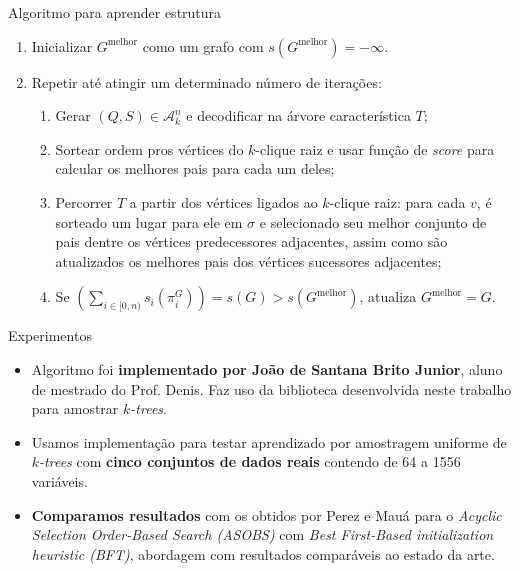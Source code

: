 \documentclass{beamer}
\begin{document}
\begin{frame}
\begin{columns}[t]
\begin{column}{0.5\textwidth}
\begin{block}{Algoritmo para aprender estrutura}
    \begin{enumerate}
      \item Inicializar $G^{\text{melhor}}$ como um grafo com $s(G^{\text{melhor}}) = -\infty$.
      \item Repetir até atingir um determinado número de iterações:
        \begin{enumerate}
          \item Gerar $(Q, S) \in \mathcal{A}^n_k$ e decodificar na árvore característica $T$;
          \item Sortear ordem pros vértices do $k$-clique raiz e usar função de \emph{score} para calcular os melhores pais para cada um deles;
          \item Percorrer $T$ a partir dos vértices ligados ao $k$-clique raiz: para cada $v$, é sorteado um lugar para ele em $\sigma$ e selecionado seu melhor conjunto de pais dentre os vértices predecessores adjacentes, assim como são atualizados os melhores pais dos vértices sucessores adjacentes;
          \item Se $\left(\sum_{i \in [0,n)} s_i(\pi^G_{i})\right) = s(G) > s(G^{\text{melhor}})$, atualiza $G^{\text{melhor}} = G$.
        \end{enumerate}
    \end{enumerate}
  \end{block}

  \begin{block}{Experimentos}
    \begin{itemize}
      \item Algoritmo foi \textbf{implementado por João de Santana Brito Junior}, aluno de mestrado do Prof. Denis. Faz uso da biblioteca desenvolvida neste trabalho para amostrar \emph{$k$-trees}.
      \item Usamos implementação para testar aprendizado por amostragem uniforme de \emph{$k$-trees} com \textbf{cinco conjuntos de dados reais} contendo de 64 a 1556 variáveis.
      \item \textbf{Comparamos resultados} com os obtidos por Perez e Mauá \cite{perez} para o \emph{Acyclic Selection Order-Based Search (ASOBS)} com \emph{Best First-Based initialization heuristic (BFT)}, abordagem com resultados comparáveis ao estado da arte.
    \end{itemize}

    \begin{table}
      \centering


\end{table}
\end{block}
\end{column}
\end{columns}
\end{frame}
\end{document}
